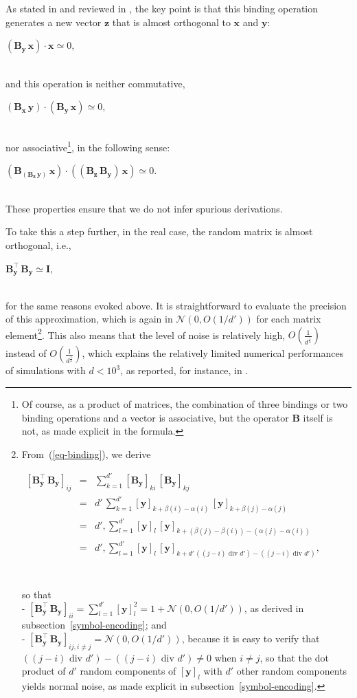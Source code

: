 \documentclass[sn-mathphys]{sn-jnl}
\newcommand{\eqline}[1]{~\vspace{0.1cm}\\\centerline{$#1$}\vspace{0.1cm}\\}
\begin{document}
\begin{appendices}
As stated in \cite{gosmann_vector-derived_2019} and reviewed in \cite{mercier_ontology_2021}, the key point is that this binding operation generates a new vector $\mathbf{z}$ that is almost orthogonal to $\mathbf{x}$ and $\mathbf{y}$:
\eqline{(\mathbf{B_y} \, \mathbf{x}) \cdot \mathbf{x} \simeq 0,}
and this operation is neither commutative,
\eqline{(\mathbf{B_x} \, \mathbf{y}) \cdot (\mathbf{B_y} \, \mathbf{x}) \simeq 0,}
nor associative\footnote{Of course, as a product of matrices, the combination of three bindings or two binding operations and a vector is associative, but the operator $\mathbf{B}$ itself is not, as made explicit in the formula.}, in the following sense:
\eqline{(\mathbf{B_{(B_z \, y)}} \, \mathbf{x}) \cdot ((\mathbf{B_z} \, \mathbf{B_y}) \, \mathbf{x}) \simeq 0.}
These properties ensure that we do not infer spurious derivations.

To take this a step further, in the real case, the random matrix is almost orthogonal, i.e.,
\eqline{\mathbf{B_y^\top} \, \mathbf{B_y} \simeq \mathbf{I},}
for the same reasons evoked above. It is straightforward to evaluate the precision of this approximation, which is again in ${\mathcal N}(0, O(1/d'))$ for each matrix element\footnote{From~(\ref{eq-binding}), we derive
\eqline{\begin{array}{rcl}
    \left[\mathbf{B_y^\top} \, \mathbf{B_y}\right]_{ij}
    &=& \sum_{k = 1}^{d'} [\mathbf{B_y}]_{ki} \, [\mathbf{B_y}]_{kj} \\
    &=& d' \, \sum_{k = 1}^{d'} [\mathbf{y}]_{k + \beta(i) - \alpha(i)} \, [\mathbf{y}]_{k + \beta(j) - \alpha(j)} \\
    &=& d' , \sum_{l = 1}^{d'} [\mathbf{y}]_l \, [\mathbf{y}]_{k + (\beta(j) - \beta(i)) - (\alpha(j) - \alpha(i))} \\
    &=& d' , \sum_{l = 1}^{d'} [\mathbf{y}]_l \, [\mathbf{y}]_{k + d' \, ((j - i) \mbox{ div } d') - ((j - i) \mbox{ div } d')}, \\
\end{array}}
so that
\\- $\left[\mathbf{B_y^\top} \, \mathbf{B_y}\right]_{ii} = \sum_{l = 1}^{d'} [\mathbf{y}]_l^2 = 1 + {\mathcal N}(0, O(1/d'))$, as derived in subsection~\ref{symbol-encoding}; and
\\- $\left[\mathbf{B_y^\top} \, \mathbf{B_y}\right]_{ij, i \ne j} = {\mathcal N}(0, O(1/d'))$, because it is easy to verify that $((j - i) \mbox{ div } d') - ((j - i) \mbox{ div } d') \ne 0$ when $i \ne j$, so that the dot product of $d'$ random components of $[\mathbf{y}]_l$ with $d'$ other random components yields normal noise, as made explicit in subsection~\ref{symbol-encoding}.}. This also means that the level of noise is relatively high, $O\left(\frac{1}{d^{\frac{1}{4}}}\right)$ instead of $O\left(\frac{1}{d^{\frac{1}{2}}}\right)$, which explains the relatively limited numerical performances of simulations with $d< 10^3$, as reported, for instance, in \cite{schlegel_comparison_2020}.



\end{appendices}
\end{document}

